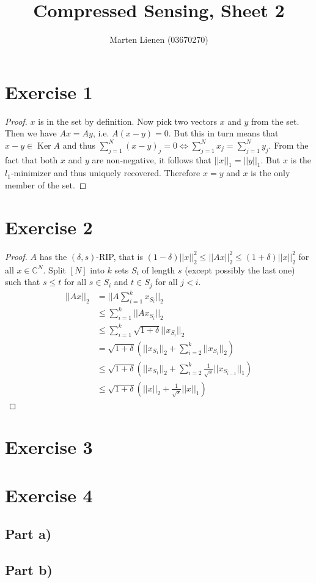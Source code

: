 \documentclass[10pt,a4paper]{article}
\title{Compressed Sensing, Sheet 2}
\author{Marten Lienen (03670270)}
\DeclareMathOperator{\Ker}{Ker}
\begin{document}
\maketitle

\section*{Exercise 1}

\begin{proof}
  $x$ is in the set by definition.
  Now pick two vectors $x$ and $y$ from the set.
  Then we have $Ax = Ay$, i.e. $A(x - y) = 0$.
  But this in turn means that $x - y \in \Ker A$ and thus $\sum_{j = 1}^{N} (x - y)_{j} = 0 \Leftrightarrow \sum_{j = 1}^{N} x_{j} = \sum_{j = 1}^{N} y_{j}$.
  From the fact that both $x$ and $y$ are non-negative, it follows that $||x||_{1} = ||y||_{1}$.
  But $x$ is the $l_{1}$-minimizer and thus uniquely recovered.
  Therefore $x = y$ and $x$ is the only member of the set.
\end{proof}

\section*{Exercise 2}

\begin{proof}
  $A$ has the $(\delta, s)$-RIP, that is $(1 - \delta)||x||_{2}^{2} \le ||Ax||_{2}^{2} \le (1 + \delta)||x||_{2}^{2}$ for all $x \in \mathbb{C}^{N}$.
  Split $[N]$ into $k$ sets $S_{i}$ of length $s$ (except possibly the last one) such that $s \le t$ for all $s \in S_{i}$ and $t \in S_{j}$ for all $j < i$.
  \begin{align*}
    ||Ax||_{2} & = ||A\sum_{i = 1}^{k} x_{S_{i}}||_{2}\\
               & \le \sum_{i = 1}^{k} ||Ax_{S_{i}}||_{2}\\
               & \le \sum_{i = 1}^{k} \sqrt{1 + \delta} ||x_{S_{i}}||_{2}\\
               & = \sqrt{1 + \delta} \left( ||x_{S_{1}}||_{2} + \sum_{i = 2}^{k} ||x_{S_{i}}||_{2} \right)\\
               & \le \sqrt{1 + \delta} \left( ||x_{S_{1}}||_{2} + \sum_{i = 2}^{k} \frac{1}{\sqrt{s}} ||x_{S_{i - 1}}||_{1} \right)\\
               & \le \sqrt{1 + \delta} \left( ||x||_{2} + \frac{1}{\sqrt{s}} ||x||_{1} \right)
  \end{align*}
\end{proof}

\section*{Exercise 3}

\section*{Exercise 4}

\subsection*{Part a)}

\subsection*{Part b)}
\end{document}
